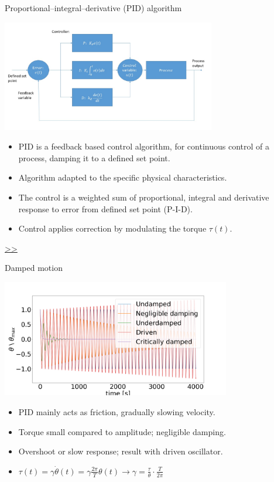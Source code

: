 \documentclass{beamer}
\begin{document}
\begin{frame}{\hypertarget{frame:Proportional–integral–derivative (PID) algorithm}{Proportional–integral–derivative (PID) algorithm}}
	\begin{center}		
		\includegraphics[width=0.7\textwidth,keepaspectratio]{pid_diagram_powerpoint.jpg}
    \end{center}
	\begin{itemize}	

		\item PID is a feedback based control algorithm, for continuous control of a process, damping it to a defined set point.
		\item Algorithm adapted to the specific physical characteristics.
		\item The control is a weighted sum of proportional, integral and derivative response to error from defined set point (P-I-D).
		\item Control applies correction by modulating the torque $\tau(t)$.


	\end{itemize}
	\hyperlink{frame:Proportional–integral–derivative (PID) algorithm 1}{>>} 
\end{frame}


\begin{frame}{Damped motion}
	\begin{center}		
		\includegraphics[width=0.75\textwidth,keepaspectratio]{underdamp.png}
	\end{center}
	\begin{itemize}		
		\item PID mainly acts as friction, gradually slowing velocity.
		\item Torque small compared to amplitude; negligible damping. 
		\item Overshoot or slow response; result with driven oscillator.
		\item $\tau(t) =  \gamma\dot{\theta}(t) =  \gamma\frac{2\pi}{T} \theta( t) \rightarrow \gamma  =\frac{\tau}{\theta}\cdot \frac{ T}{2\pi} $
		
	\end{itemize}
\end{frame}
\end{document}
